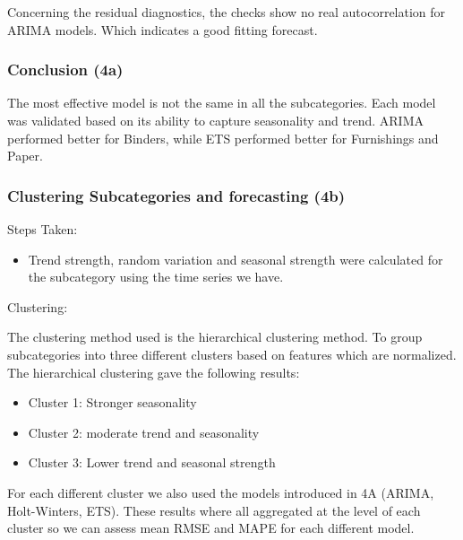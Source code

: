 \documentclass[
  letterpaper,
  DIV=11,
  numbers=noendperiod]{scrartcl}
\providecommand{\tightlist}{%
  \setlength{\itemsep}{0pt}\setlength{\parskip}{0pt}}\usepackage{longtable,booktabs,array}
\begin{document}
Concerning the residual diagnostics, the checks show no real
autocorrelation for ARIMA models. Which indicates a good fitting
forecast.

\subsubsection{Conclusion (4a)}\label{conclusion-4a}

The most effective model is not the same in all the subcategories. Each
model was validated based on its ability to capture seasonality and
trend. ARIMA performed better for Binders, while ETS performed better
for Furnishings and Paper.

\subsubsection{Clustering Subcategories and forecasting
(4b)}\label{clustering-subcategories-and-forecasting-4b}

Steps Taken:

\begin{itemize}
\tightlist
\item
  Trend strength, random variation and seasonal strength were calculated
  for the subcategory using the time series we have.
\end{itemize}

Clustering:

The clustering method used is the hierarchical clustering method. To
group subcategories into three different clusters based on features
which are normalized. The hierarchical clustering gave the following
results:

\begin{itemize}
\item
  Cluster 1: Stronger seasonality
\item
  Cluster 2: moderate trend and seasonality
\item
  Cluster 3: Lower trend and seasonal strength
\end{itemize}

For each different cluster we also used the models introduced in 4A
(ARIMA, Holt-Winters, ETS). These results where all aggregated at the
level of each cluster so we can assess mean RMSE and MAPE for each
different model.
\end{document}
